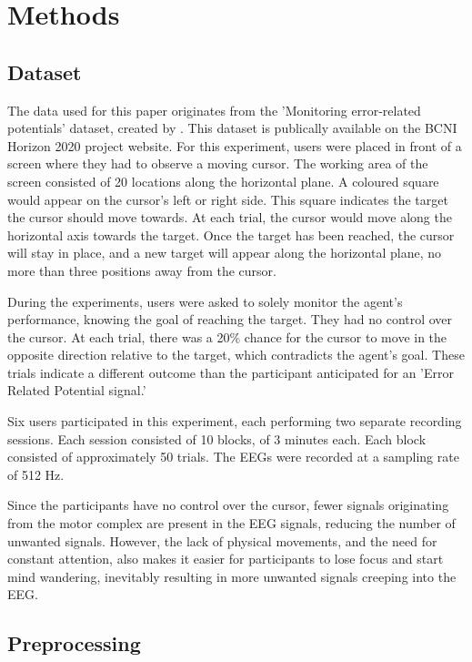 \section{Methods}\label{sec:methods}

\subsection{Dataset}

The data used for this paper originates from the 'Monitoring error-related potentials' dataset, created by \cite{chavarriaga2010learning}. This dataset is publically available on the BCNI Horizon 2020 project website. For this experiment, users were placed in front of a screen where they had to observe a moving cursor. The working area of the screen consisted of 20 locations along the horizontal plane. A coloured square would appear on the cursor's left or right side. This square indicates the target the cursor should move towards. At each trial, the cursor would move along the horizontal axis towards the target. Once the target has been reached, the cursor will stay in place, and a new target will appear along the horizontal plane, no more than three positions away from the cursor.

During the experiments, users were asked to solely monitor the agent's performance, knowing the goal of reaching the target. They had no control over the cursor. At each trial, there was a 20\% chance for the cursor to move in the opposite direction relative to the target, which contradicts the agent's goal. These trials indicate a different outcome than the participant anticipated for an 'Error Related Potential signal.'

Six users participated in this experiment, each performing two separate recording sessions. Each session consisted of 10 blocks, of 3 minutes each. Each block consisted of approximately 50 trials. The EEGs were recorded at a sampling rate of 512 Hz.

Since the participants have no control over the cursor, fewer signals originating from the motor complex are present in the EEG signals, reducing the number of unwanted signals. However, the lack of physical movements, and the need for constant attention, also makes it easier for participants to lose focus and start mind wandering, inevitably resulting in more unwanted signals creeping into the EEG.

\subsection{Preprocessing}

